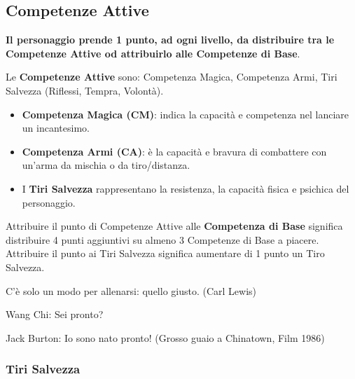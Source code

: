 \begin{multicols}{2}
\subsection{Competenze Attive}\label{competenzeattive}

\textbf{Il personaggio prende 1 punto, ad ogni livello, da distribuire tra le Competenze Attive od attribuirlo alle Competenze di Base}.

\medskip

Le \textbf{Competenze Attive} sono: Competenza Magica, Competenza Armi, Tiri Salvezza (Riflessi, Tempra, Volontà).

\noindent\begin{itemize}[leftmargin=*] \setlength{\itemsep}{0pt}

\item \textbf{Competenza Magica (CM)}:  indica la capacità e competenza nel lanciare un incantesimo.

\item \textbf{Competenza Armi (CA)}:  è la capacità e bravura di combattere con un'arma da mischia o da tiro/distanza.

\item I \textbf{Tiri Salvezza} rappresentano la resistenza, la capacità fisica e psichica del personaggio.
\end{itemize}

Attribuire il punto di Competenze Attive alle \textbf{Competenza di Base} significa distribuire 4 punti aggiuntivi su almeno 3 Competenze di Base a piacere. Attribuire il punto ai Tiri Salvezza significa aumentare di 1 punto un Tiro Salvezza.

\medskip

\begin{changemargin}{0.3cm}{0.3cm}\begin{enfasi}{C'è solo un modo per allenarsi: quello giusto. (Carl Lewis)
\medskip

Wang Chi: Sei pronto?

Jack Burton: Io sono nato pronto! (Grosso guaio a Chinatown, Film 1986)
}\end{enfasi}\end{changemargin}


\subsubsection{Tiri Salvezza}\label{tirisavellza}


\end{multicols}
